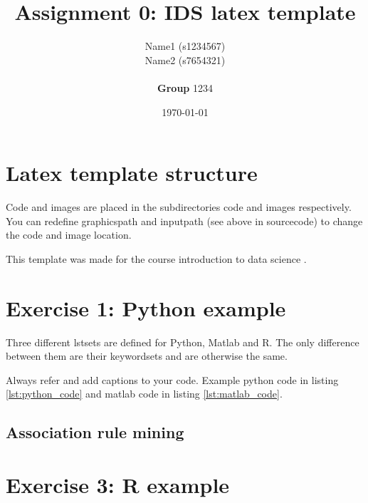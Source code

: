 \documentclass[a4paper]{article}
\title{Assignment 0: IDS latex template}
\author{
Name1 (s1234567) \\ 
Name2 (s7654321) \\ 
 \\ \textbf{Group} 1234}
\date{\today}
\begin{document}
\maketitle


\section*{Latex template structure}

Code and images are placed in the subdirectories code and images respectively. You can redefine graphicspath and inputpath (see above in sourcecode) to change the code and image location.

This template was made for the course introduction to data science \cite{IDS2017}.


\section*{Exercise 1: Python example}

Three different lstsets are defined for Python, Matlab and R. The only difference between them are their keywordsets and are otherwise the same.

Always refer and add captions to your code. Example python code in listing \ref{lst:python_code} and matlab code in listing \ref{lst:matlab_code}.





\subsection{Association rule mining}

\section*{Exercise 3: R example}
\end{document}

